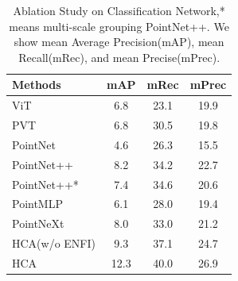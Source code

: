 \begin{table}[ht]
\caption{Ablation Study on Classification Network,* means multi-scale grouping PointNet++. We show mean Average Precision(mAP), mean Recall(mRec), and mean Precise(mPrec).}
\label{tab:secondstage}
\begin{tabular}{l|ccc}

\hline
\multicolumn{1}{l|}{Methods} & mAP  & mRec & mPrec \\ \hline
ViT\cite{dosovitskiy2020image}                          & 6.8  & 23.1 & 19.9  \\ \hline
PVT\cite{zhang2022pvt}                          & 6.8  & 30.5 & 19.8  \\
PointNet\cite{qi2017pointnet}                     & 4.6  & 26.3 & 15.5  \\
PointNet++\cite{qi2017pointnet++}              & 8.2  & 34.2 & 22.7  \\
PointNet++*           & 7.4  & 34.6 & 20.6  \\
PointMLP\cite{ma2022rethinking}                     & 6.1  & 28.0 & 19.4  \\
PointNeXt\cite{qian2022pointnext}                    & 8.0  & 33.0 & 21.2  \\ \hline
HCA(w/o ENFI)         & 9.3  & 37.1 & 24.7  \\
HCA                  & 12.3 & 40.0 & 26.9  \\ \hline
\end{tabular}
\end{table}

\fi



